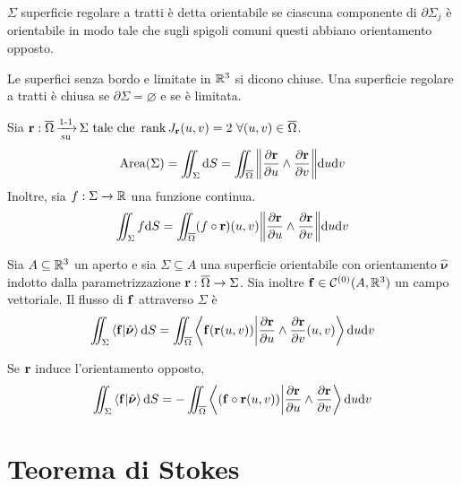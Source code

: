 \begin{definition}
	$\Sigma$ superficie regolare a tratti è detta orientabile se ciascuna componente di $\partial \Sigma_j$ è orientabile in modo tale che sugli spigoli comuni questi abbiano orientamento opposto.
\end{definition}

\begin{definition}
	Le superfici senza bordo e limitate in $\mathbb{R}^3$ si dicono chiuse. Una superficie regolare a tratti è chiusa se $\partial \Sigma = \varnothing$ e se è limitata.
\end{definition}

\begin{definition}
	Sia $\vb{r}:\overline{\Omega} \operatorname{\xrightarrow[\operatorname{su}]{\operatorname{1-1}}} \Sigma \text{ tale che } \rank J_{\vb{r}}(u,v) = 2 \ \forall (u,v) \in \overline{\Omega}$.
	$$
		\operatorname{Area} (\Sigma) = \iint_\Sigma \dd S = \iint_{\overline{\Omega}} \norm{\frac{\partial \vb{r}}{\partial u}\wedge \frac{\partial \vb{r}}{\partial v}}\dd u \dd v
	$$
	Inoltre, sia $f: \Sigma \to \mathbb{R}$ una funzione continua.
	$$
		\iint_\Sigma f \dd S = \iint_{\overline{\Omega}}(f\circ\vb{r})(u,v)\norm{\frac{\partial \vb{r}}{\partial u}\wedge \frac{\partial \vb{r}}{\partial v}}\dd u \dd v
	$$
\end{definition}

\begin{definition}
	[Flusso]
	Sia $A\subseteq \mathbb{R}^3$ un aperto e sia $\Sigma \subseteq A$ una superficie orientabile con orientamento $\hat{\bm \nu}$ indotto dalla parametrizzazione $\vb{r}:\overline{\Omega}\to\Sigma$. Sia inoltre $\vb{f} \in \mathcal{C}^{(0)}(A,\mathbb{R}^3)$ un campo vettoriale. Il flusso di $\vb{f}$ attraverso $\Sigma$ è
	$$
		\iint_\Sigma \ip{\vb{f}}{\hat{\bm\nu}}\dd S = \iint_{\overline{\Omega}}\ip{\vb{f}(\vb{r}(u,v))}{\frac{\partial \vb{r}}{\partial u} \wedge \frac{\partial \vb{r}}{\partial v}(u,v)}\dd u \dd v
	$$
\end{definition}

\begin{remark}
	Se $\vb{r}$ induce l'orientamento opposto,
	$$
		\iint_\Sigma \ip{\vb{f}}{\hat{\bm\nu}}\dd S = -\iint_{\overline{\Omega}}\ip{(\vb{f}\circ\vb{r}(u,v))}{\frac{\partial \vb{r}}{\partial u}\wedge \frac{\partial \vb{r}}{\partial v}}\dd u \dd v
	$$
\end{remark}

\section{Teorema di Stokes}

